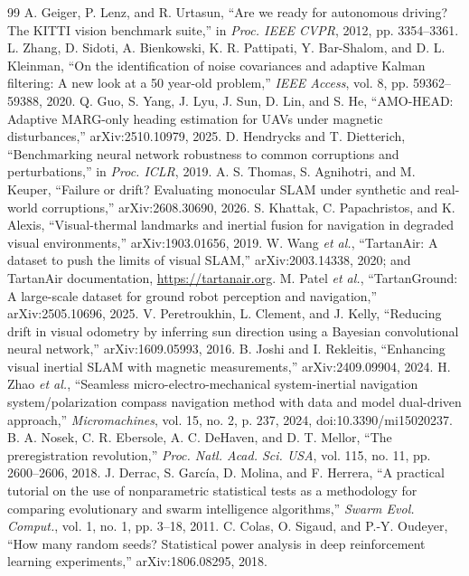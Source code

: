 \documentclass[conference]{IEEEtran}
\begin{document}
\begin{thebibliography}{99}
 A. Geiger, P. Lenz, and R. Urtasun, ``Are we ready for autonomous driving? The KITTI vision benchmark suite,'' in \emph{Proc. IEEE CVPR}, 2012, pp. 3354--3361.
 L. Zhang, D. Sidoti, A. Bienkowski, K. R. Pattipati, Y. Bar-Shalom, and D. L. Kleinman, ``On the identification of noise covariances and adaptive Kalman filtering: A new look at a 50 year-old problem,'' \emph{IEEE Access}, vol. 8, pp. 59362--59388, 2020.
 Q. Guo, S. Yang, J. Lyu, J. Sun, D. Lin, and S. He, ``AMO-HEAD: Adaptive MARG-only heading estimation for UAVs under magnetic disturbances,'' arXiv:2510.10979, 2025.
 D. Hendrycks and T. Dietterich, ``Benchmarking neural network robustness to common corruptions and perturbations,'' in \emph{Proc. ICLR}, 2019.
 A. S. Thomas, S. Agnihotri, and M. Keuper, ``Failure or drift? Evaluating monocular SLAM under synthetic and real-world corruptions,'' arXiv:2608.30690, 2026.
 S. Khattak, C. Papachristos, and K. Alexis, ``Visual-thermal landmarks and inertial fusion for navigation in degraded visual environments,'' arXiv:1903.01656, 2019.
 W. Wang \emph{et al.}, ``TartanAir: A dataset to push the limits of visual SLAM,'' arXiv:2003.14338, 2020; and TartanAir documentation, \url{https://tartanair.org}.
 M. Patel \emph{et al.}, ``TartanGround: A large-scale dataset for ground robot perception and navigation,'' arXiv:2505.10696, 2025.
 V. Peretroukhin, L. Clement, and J. Kelly, ``Reducing drift in visual odometry by inferring sun direction using a Bayesian convolutional neural network,'' arXiv:1609.05993, 2016.
 B. Joshi and I. Rekleitis, ``Enhancing visual inertial SLAM with magnetic measurements,'' arXiv:2409.09904, 2024.
 H. Zhao \emph{et al.}, ``Seamless micro-electro-mechanical system-inertial navigation system/polarization compass navigation method with data and model dual-driven approach,'' \emph{Micromachines}, vol. 15, no. 2, p. 237, 2024, doi:10.3390/mi15020237.
 B. A. Nosek, C. R. Ebersole, A. C. DeHaven, and D. T. Mellor, ``The preregistration revolution,'' \emph{Proc. Natl. Acad. Sci. USA}, vol. 115, no. 11, pp. 2600--2606, 2018.
 J. Derrac, S. Garc\'ia, D. Molina, and F. Herrera, ``A practical tutorial on the use of nonparametric statistical tests as a methodology for comparing evolutionary and swarm intelligence algorithms,'' \emph{Swarm Evol. Comput.}, vol. 1, no. 1, pp. 3--18, 2011.
 C. Colas, O. Sigaud, and P.-Y. Oudeyer, ``How many random seeds? Statistical power analysis in deep reinforcement learning experiments,'' arXiv:1806.08295, 2018.

\end{thebibliography}
\end{document}
